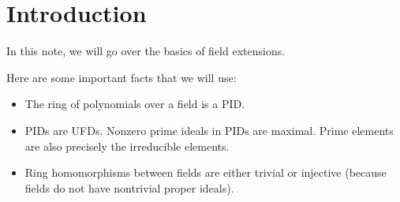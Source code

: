 \section{Introduction}
In this note, we will go over the basics of field extensions.

Here are some important facts that we will use:
\begin{itemize}
    \item The ring of polynomials over a field is a PID.
    \item PIDs are UFDs. Nonzero prime ideals in PIDs are maximal. Prime elements are also precisely the irreducible elements.
    \item Ring homomorphisms between fields are either trivial or injective (because fields do not have nontrivial proper ideals).
\end{itemize}
